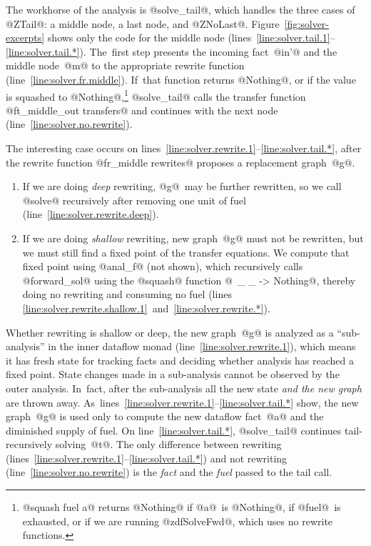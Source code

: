 \documentclass[blockstyle,preprint,nocopyrightspace]{sigplanconf}
\newcommand\lineref[1]{line~\ref{line:#1}}
\newcommand\linepairref[2]{lines \ref{line:#1}~and~\ref{line:#2}}
\newcommand\linerangeref[2]{\mbox{lines~\ref{line:#1}--\ref{line:#2}}}
\newcommand{\authornote}[1]{{\em #1}}
\def\authornote#1{\unskip\relax}
\newcommand{\norman}[1]{\authornote{NR: #1}}
\let\remark\norman
\newcommand\figref[1]{Figure~\ref{fig:#1}}
\begin{document}
The workhorse of the analysis is @solve_tail@, which handles the three
cases of @ZTail@: a middle node, a last node, and @ZNoLast@.
\figref{solver-excerpts} shows only the code for the middle node
(\linerangeref{solver.tail.1}{solver.tail.*}).
The~first step presents the incoming fact~@in'@ and the middle
node~@m@ to the appropriate rewrite function (\lineref{solver.fr.middle}).
If~that function returns @Nothing@, or if the value is squashed to
@Nothing@,\footnote
{@squash fuel a@ returns @Nothing@ if @a@~is @Nothing@, if @fuel@~is
  exhausted, or if we are running @zdfSolveFwd@, which uses no rewrite
  functions.
}
@solve_tail@
calls the transfer function
@ft_middle_out transfers@ and continues with the next node
(\lineref{solver.no.rewrite}). 



The interesting case occurs on \linerangeref{solver.rewrite.1}{solver.tail.*},
after the rewrite function 
@fr_middle rewrites@
proposes a replacement graph~@g@.
\remark{Orphaned text:
and
a list of facts that hold on edges leaving the graph, which is  
 extracted using function @zdfFpLastOuts@.
\iffalse %
In the example above, when the subgraph
@z = 7 + y@ is analyzed, @zdfFpLastOuts@ will contain
the pair $(@L2@, @x == 7@ \land @y == 8@)$.
\fi
}
\begin{enumerate}
\item
If we are doing \emph{deep} rewriting, @g@~may be further rewritten,
so we call @solve@ recursively after removing one unit of fuel (\lineref{solver.rewrite.deep}).
\item
If we are doing \emph{shallow} rewriting,  new graph~@g@ must not be
rewritten, but we must still find a fixed point of the transfer
equations.
We compute that fixed point using @anal_f@ (not shown), which  recursively calls
@forward_sol@ using the @squash@ function
@\ _ _ -> Nothing@, 
thereby doing no rewriting and consuming no fuel
(\linepairref{solver.rewrite.shallow.1}{solver.rewrite.*}).

\end{enumerate}
Whether rewriting is shallow or deep, the new graph~@g@ is analyzed as
a ``sub-analysis'' in the inner dataflow monad
(\lineref{solver.rewrite.1}), which means it has fresh 
state for tracking facts and deciding whether analysis has reached a
fixed point.
State changes made in a sub-analysis cannot be observed by the outer
analysis. 
In~fact, after the sub-analysis all the new state \emph{and the new
  graph} are thrown away.
As~\linerangeref{solver.rewrite.1}{solver.tail.*} show, the new
graph~@g@ is used only to compute the new 
dataflow fact~@a@ and the diminished
supply of fuel.
On \lineref{solver.tail.*}, @solve_tail@ continues tail-recursively solving~@t@.
The only difference between rewriting
(\linerangeref{solver.rewrite.1}{solver.tail.*}) and not 
rewriting (\lineref{solver.no.rewrite}) is the
\emph{fact} and the \emph{fuel} passed to the tail call.
\end{document}
